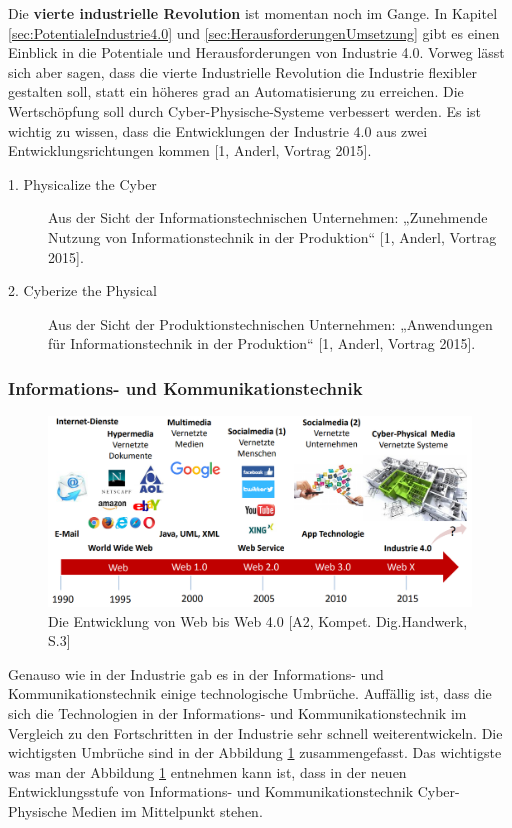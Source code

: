 \newline\newline
Die \textbf{vierte industrielle Revolution} ist momentan noch im Gange. In Kapitel \ref{sec:PotentialeIndustrie4.0} und \ref{sec:HerausforderungenUmsetzung} gibt es einen Einblick in die Potentiale und Herausforderungen von Industrie 4.0. Vorweg lässt sich aber sagen, dass die vierte Industrielle Revolution die Industrie flexibler gestalten soll, statt ein höheres grad an Automatisierung zu erreichen. Die Wertschöpfung soll durch Cyber-Physische-Systeme verbessert werden. Es ist wichtig zu wissen, dass die Entwicklungen der Industrie 4.0 aus zwei Entwicklungsrichtungen kommen [1, Anderl, Vortrag 2015].
\begin{description}
	\item[1. Physicalize the Cyber] Aus der Sicht der Informationstechnischen Unternehmen: „Zunehmende Nutzung von Informationstechnik in der Produktion“ [1, Anderl, Vortrag 2015].
	\item[2. Cyberize the Physical] Aus der Sicht der Produktionstechnischen Unternehmen: „Anwendungen für Informationstechnik in der Produktion“ [1, Anderl, Vortrag 2015].
\end{description}

\subsubsection{Informations- und Kommunikationstechnik}\label{sec:WebRevolution}
\begin{figure}[h]
	\centering
	\includegraphics[width=1\linewidth]{Bilder/A2_EntwicklungWeb0-4}
	\caption{Die Entwicklung von Web bis Web 4.0 [A2, Kompet. Dig.Handwerk, S.3]}
	\label{fig:WebRevolutionBild}
\end{figure}
Genauso wie in der Industrie gab es in der Informations- und Kommunikationstechnik einige technologische Umbrüche. Auffällig ist, dass die sich die Technologien in der Informations- und Kommunikationstechnik im Vergleich zu den Fortschritten in der Industrie sehr schnell weiterentwickeln. Die wichtigsten Umbrüche sind in der Abbildung \ref{fig:WebRevolutionBild} zusammengefasst.
\newline\newline
Das wichtigste was man der Abbildung \ref{fig:WebRevolutionBild} entnehmen kann ist, dass in der neuen Entwicklungsstufe von Informations- und Kommunikationstechnik Cyber-Physische Medien im Mittelpunkt stehen.

